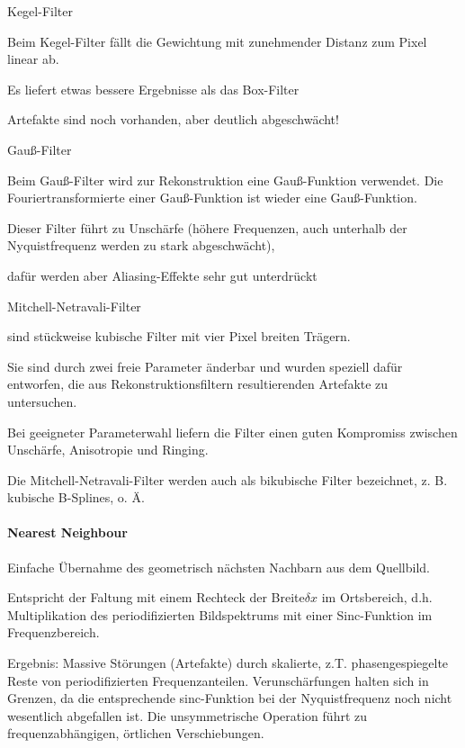 \documentclass[landscape]{article}
\begin{document}
\begin{multicols}{3}
\begin{itemize*}
    \item Kegel-Filter
    \begin{itemize*}
      \item Beim Kegel-Filter fällt die Gewichtung mit zunehmender Distanz zum Pixel linear ab.
      \item Es liefert etwas bessere Ergebnisse als das Box-Filter
      \item Artefakte sind noch vorhanden, aber deutlich abgeschwächt!
    \end{itemize*}
    
    \item Gauß-Filter
    \begin{itemize*}
      \item Beim Gauß-Filter wird zur Rekonstruktion eine Gauß-Funktion verwendet. Die Fouriertransformierte einer Gauß-Funktion ist wieder eine Gauß-Funktion.
      \item Dieser Filter führt zu Unschärfe (höhere Frequenzen, auch unterhalb der Nyquistfrequenz werden zu stark abgeschwächt),
      \item dafür werden aber Aliasing-Effekte sehr gut unterdrückt
    \end{itemize*}
    
    \item Mitchell-Netravali-Filter
    \begin{itemize*}
      \item sind stückweise kubische Filter mit vier Pixel breiten Trägern.
      \item Sie sind durch zwei freie Parameter änderbar und wurden speziell dafür entworfen, die aus Rekonstruktionsfiltern resultierenden Artefakte zu untersuchen.
      \item Bei geeigneter Parameterwahl liefern die Filter einen guten Kompromiss zwischen Unschärfe, Anisotropie und Ringing.
      \item Die Mitchell-Netravali-Filter werden auch als bikubische Filter bezeichnet, z. B. kubische B-Splines, o. Ä.
    \end{itemize*}
  \end{itemize*}
  
  \paragraph{Nearest Neighbour}
  \begin{itemize*}
    \item Einfache Übernahme des geometrisch nächsten Nachbarn aus dem Quellbild.
    \item Entspricht der Faltung mit einem Rechteck der Breite$\delta x$ im Ortsbereich, d.h. Multiplikation des periodifizierten Bildspektrums mit einer Sinc-Funktion im Frequenzbereich.
    \item Ergebnis: Massive Störungen (Artefakte) durch skalierte, z.T. phasengespiegelte Reste von periodifizierten Frequenzanteilen. Verunschärfungen halten sich in Grenzen, da die entsprechende sinc-Funktion bei der Nyquistfrequenz noch nicht wesentlich abgefallen ist. Die unsymmetrische Operation führt zu frequenzabhängigen, örtlichen Verschiebungen.
  \end{itemize*}
  

\end{multicols}
\end{document}
